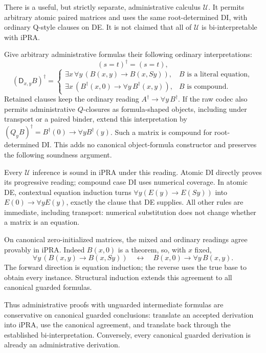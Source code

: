 \documentclass[11pt,letterpaper]{article}
\theoremstyle{definition}
\begin{document}
There is a useful, but strictly separate, administrative calculus
$\mathcal U$.  It permits arbitrary atomic paired matrices and uses
the same root-determined DI, with ordinary Q-style clauses on DE.
It is not claimed that all of $\mathcal U$ is bi-interpretable with iPRA.

Give arbitrary administrative formulas their following ordinary
interpretations:
\[
 (s=t)^\dagger=(s=t),
\]
\[
 (\mathsf D_{x,y}B)^\dagger=
 \begin{cases}
 \exists x\,\forall y\,(B(x,y)\to B(x,Sy)),
       &B\text{ is a literal equation},\\[2pt]
 \exists x\,(B^\dagger(x,0)\to\forall y\,B^\dagger(x,y)),
       &B\text{ is compound}.
 \end{cases}
 \tag{Mixed administrative reading}\label{eq:guarded-mixed}
\]
Retained clauses keep the ordinary reading
$A^\dagger\to\forall y\,B^\dagger$.
If the raw codec also permits administrative $Q$-closures as
formula-shaped objects, including under transport or a paired binder,
extend this interpretation by
$(Q_yB)^\dagger=B^\dagger(0)\to\forall yB^\dagger(y)$.
Such a matrix is compound for root-determined DI.  This adds no
canonical object-formula constructor and preserves the following
soundness argument.

Every $\mathcal U$ inference is sound in iPRA under this reading.
Atomic DI directly proves its progressive reading; compound case DI
uses numerical coverage.  In atomic DE, contextual equation induction
turns $\forall y(E(y)\to E(Sy))$ into
$E(0)\to\forall yE(y)$, exactly the clause that DE supplies.
All other rules are immediate, including transport: numerical
substitution does not change whether a matrix is an equation.

On canonical zero-initialized matrices, the mixed and ordinary readings
agree provably in iPRA.  Indeed $B(x,0)$ is a theorem, so, with $x$ fixed,
\[
 \forall y\,(B(x,y)\to B(x,Sy))
 \quad\longleftrightarrow\quad
 B(x,0)\to\forall y\,B(x,y).
\]
The forward direction is equation induction; the reverse uses the
true base to obtain every instance.  Structural induction extends
this agreement to all canonical guarded formulas.

Thus administrative proofs with unguarded intermediate formulas are
conservative on canonical guarded conclusions: translate an accepted
derivation into iPRA, use the canonical agreement, and translate back
through the established bi-interpretation.  Conversely, every canonical
guarded derivation is already an administrative derivation.
\end{document}
